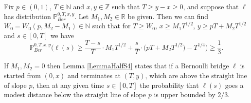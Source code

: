 \begin{lemma}\label{LemmaHalfS4} Fix $p \in (0,1)$, $T \in \mathbb{N}$ and $x, y\in \mathbb{Z}$ such that $T \geq y-x \geq 0$, and suppose that $\ell$ has distribution $\mathbb{P}^{0,T,x,y}_{Ber}$. Let $M_1, M_2 \in \mathbb{R}$ be given. Then we can find $W_0 = W_0(p,M_2 - M_1) \in \mathbb{N}$ such that for $T \geq W_0$, $x \geq M_1 T^{1/2}$, $y \geq pT + M_2 T^{1/2}$ and $s \in [0,T]$ we have
\begin{equation}\label{halfEq1S4}
\mathbb{P}^{0,T,x,y}_{Ber}\Big( \ell(s)  \geq \frac{T-s}{T} \cdot M_1 T^{1/2} + \frac{s}{T} \cdot \big(p T + M_2 T^{1/2}\big) - T^{1/4} \Big) \geq \frac{1}{3}.
\end{equation}
\end{lemma}
\begin{remark}
If $M_1, M_2 = 0$ then Lemma \ref{LemmaHalfS4} states that if a Bernoulli bridge $\ell$ is started from $(0,x)$ and terminates at $(T,y)$, which are above the straight line of slope $p$, then at any given time $s \in [0,T]$ the probability that $\ell(s)$ goes a modest distance below the straight line of slope $p$ is upper bounded by $ 2/3$.
\end{remark}
